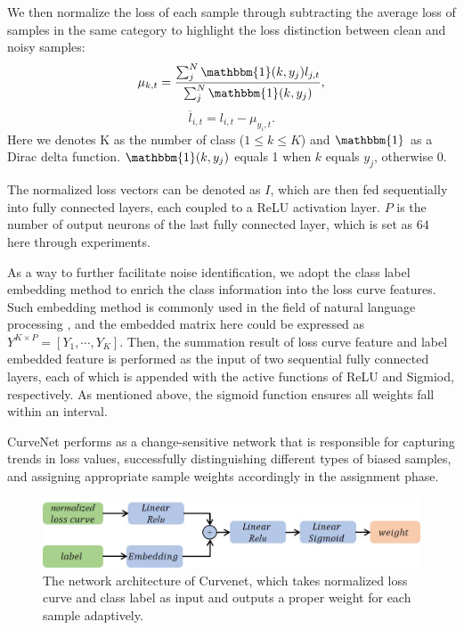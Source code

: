 \documentclass[letterpaper]{article} %
\begin{document}
We then normalize the loss of each sample through subtracting the average loss of samples in the same category to highlight the loss distinction between clean and noisy samples:
\begin{equation}
\mu_{{k,t}} = \frac{\sum_j^N \mathbbm{1}(k,y_j)l_{j,t}}{\sum_j^N \mathbbm{1}(k,y_j)},
\label{eq:mean}
\end{equation}
\begin{equation}
\overline{l}_{i,t} = l_{i,t} - \mu_{y_i,t}.
\label{eq:norm}
\end{equation}
Here we denotes K as the number of class ($1 \le k \le K$) and $\mathbbm{1}$ as a Dirac delta function.
$\mathbbm{1}(k,y_j)$ equals 1 when $k$ equals $y_j$, otherwise 0.


The normalized loss vectors can be denoted as $I$, which are then fed sequentially into fully connected layers, each coupled to a ReLU activation layer. $P$ is the number of output neurons of the last fully connected layer, which is set as $64$ here through experiments.


As a way to further facilitate noise identification, we adopt the class label embedding method to enrich the class information into the loss curve features. Such embedding method is commonly used in the field of natural language processing \cite{cao2020heteroskedastic}, and the embedded matrix here could be expressed as $Y^{K \times P} = [Y_1,\cdots,Y_K]$.
Then, the summation result of loss curve feature and label embedded feature is performed as the input of two sequential fully connected layers, each of which is appended with the active functions of ReLU and Sigmiod, respectively. As mentioned above, the sigmoid function ensures all weights fall within an interval.


CurveNet performs as a change-sensitive network that is responsible for capturing trends in loss values, successfully distinguishing different types of biased samples, and assigning appropriate sample weights accordingly in the assignment phase.


\begin{figure}[t]
\begin{center}
\includegraphics[width=1.0\linewidth]{figs/sensinet.jpg}
\end{center}
\caption{The network architecture of Curvenet, which takes normalized loss curve and class label as input and outputs a proper weight for each sample adaptively.
}
\label{fig:CurveNet}
\end{figure}
\end{document}
